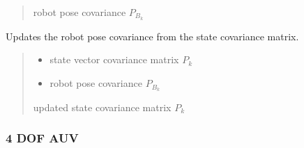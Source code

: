 \documentclass[letterpaper,10pt,english]{sphinxmanual}
\begin{document}
\begin{fulllineitems}
\begin{fulllineitems}
\begin{quote}
\begin{description}
\sphinxAtStartPar
robot pose covariance \(P_{B_k}\)

\end{description}\end{quote}

\end{fulllineitems}


\begin{fulllineitems}
\label{\detokenize{FEKFMBLocalization:FEKFMBL.FEKFMBL.SetRobotPoseCovariance}}
\pysigstartsignatures
{}
\pysigstopsignatures
\sphinxAtStartPar
Updates the robot pose covariance from the state covariance matrix.
\begin{quote}\begin{description}
\begin{itemize}
\item {} 
\sphinxAtStartPar
{} \textendash{} state vector covariance matrix \(P_k\)

\item {} 
\sphinxAtStartPar
{} \textendash{} robot pose covariance \(P_{B_k}\)

\end{itemize}

\sphinxAtStartPar
updated state covariance matrix \(P_{k}\)

\end{description}\end{quote}

\end{fulllineitems}


\end{fulllineitems}



\subsubsection{4 DOF AUV}
\label{\detokenize{FEKFMBLocalization:dof-auv}}
\end{document}
